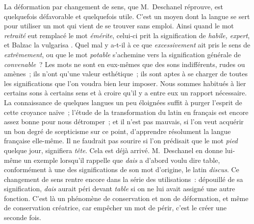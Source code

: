 \documentclass[french,twoside]{book} %
\begin{document}
La déformation par changement de sens, que M. Deschanel réprouve, est quelquefois défavorable et quelquefois utile. C’est un moyen dont la langue se sert pour utiliser un mot qui vient de se trouver sans emploi. Ainsi quand le mot {\itshape retraité} eut remplacé le mot {\itshape émérite}, celui-ci prit la signification de {\itshape habile, expert}, et Balzac la vulgarisa . Quel mal y a-t-il à ce que {\itshape excessivement} ait pris le sens de {\itshape extrêmement}, ou que le mot {\itshape potable} s’achemine vers la signification générale de {\itshape convenable} ? Les mots ne sont en eux-mêmes que des sons indifférents, rudes ou amènes ; ils n’ont qu’une valeur esthétique ; ils sont aptes à se charger de toutes les significations que l’on voudra bien leur imposer. Nous sommes habitués à lier certains sons à certains sens et à croire qu’il y a entre eux un rapport nécessaire. La connaissance de quelques langues un peu éloignées suffit à purger l’esprit de cette croyance naïve ; l’étude de la transformation du latin en français est encore assez bonne pour nous détromper ; et il n’est pas mauvais, si l’on veut acquérir un bon degré de scepticisme sur ce point, d’apprendre résolument la langue française elle-même. Il ne faudrait pas sourire si l’on prédisait que le mot {\itshape pied} quelque jour, signifiera {\itshape tête}. Cela est déjà arrivé. M. Deschanel en donne lui-même un exemple lorsqu’il rappelle que {\itshape dais} a d’abord voulu dire table, conformément à une des significations de son mot d’origine, le latin {\itshape discus}. Ce changement de sens rentre encore dans la série des utilisations : dépouillé de sa signification, {\itshape dais} aurait péri devant {\itshape table} si on ne lui avait assigné une autre fonction. C’est là un phénomène de conservation et non de déformation, et même de conservation créatrice, car empêcher un mot de périr, c’est le créer une seconde fois.\par
\end{document}
